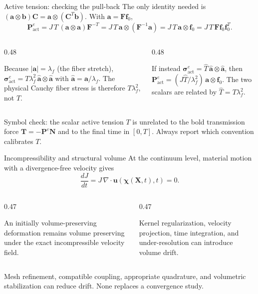 \documentclass[aspectratio=169,11pt]{beamer}
\newcommand{\Xvec}{\bm{X}}
\newcommand{\uvec}{\bm{u}}
\newcommand{\Ften}{\bm{F}}
\newcommand{\Pten}{\bm{P}^{e}}
\newcommand{\estress}{\bm{\sigma}^{e}}
\newcommand{\normal}{\bm{N}}
\begin{document}
\begin{frame}{Active tension: checking the pull-back}
\small
The only identity needed is \((\bm{a}\otimes\bm{b})\bm{C}=\bm{a}\otimes(\bm{C}^{T}\bm{b})\). With \(\bm{a}=\Ften\bm{f}_0\),
\[
\Pten_{\mathrm{act}}
=J\,T\,(\bm{a}\otimes\bm{a})\Ften^{-T}
=J\,T\,\bm{a}\otimes(\Ften^{-1}\bm{a})
=J\,T\,\bm{a}\otimes\bm{f}_0
=J\,T\,\Ften\bm{f}_0\bm{f}_0^{T}.
\]
\begin{columns}[T,onlytextwidth]
\begin{column}{0.48\textwidth}

Because \(|\bm{a}|=\lambda_f\) (the fiber stretch), \(\estress_{\mathrm{act}}=T\lambda_f^{2}\,\hat{\bm{a}}\otimes\hat{\bm{a}}\) with \(\hat{\bm{a}}=\bm{a}/\lambda_f\). The physical Cauchy fiber stress is therefore \(T\lambda_f^{2}\), not \(T\).
\end{column}
\begin{column}{0.48\textwidth}

If instead \(\estress_{\mathrm{act}}=\widehat{T}\,\hat{\bm{a}}\otimes\hat{\bm{a}}\), then \(\Pten_{\mathrm{act}}=(J\widehat{T}/\lambda_f^{2})\,\bm{a}\otimes\bm{f}_0\). The two scalars are related by \(\widehat{T}=T\lambda_f^{2}\).
\end{column}
\end{columns}

\medskip
\begin{punchbox}
\scriptsize
Symbol check: the scalar active tension \(T\) is unrelated to the bold transmission force \(\bm{T}=-\Pten\normal\) and to the final time in \([0,T]\). Always report which convention calibrates \(T\).
\end{punchbox}
\end{frame}

\begin{frame}{Incompressibility and structural volume}
At the continuum level, material motion with a divergence-free velocity gives
\[
\frac{dJ}{dt}=J\,\nabla\!\cdot\uvec(\bm{\chi}(\Xvec,t),t)=0.
\]

\begin{columns}[T,onlytextwidth]
\begin{column}{0.47\textwidth}

An initially volume-preserving deformation remains volume preserving under the exact incompressible velocity field.
\end{column}
\begin{column}{0.47\textwidth}

Kernel regularization, velocity projection, time integration, and under-resolution can introduce volume drift.
\end{column}
\end{columns}

\medskip
\begin{punchbox}
Mesh refinement, compatible coupling, appropriate quadrature, and volumetric stabilization can reduce drift. None replaces a convergence study.
\end{punchbox}
\end{frame}
\end{document}

